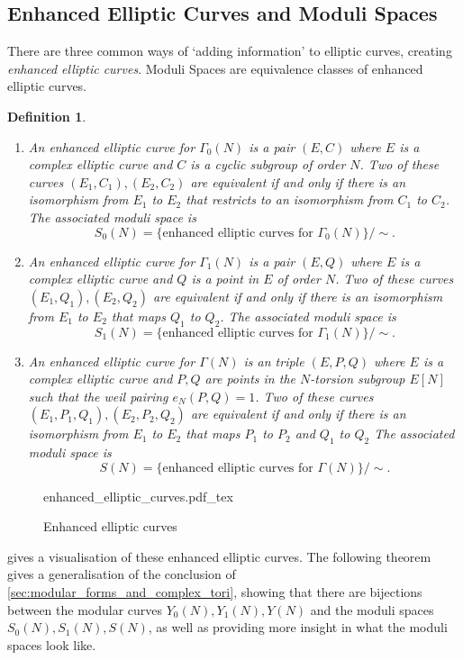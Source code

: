 \documentclass[titlepage,a4paper]{article}
\newcommand{\incfig}[1]{%
	\def\svgwidth{\columnwidth}
	{#1.pdf_tex}
}
\theoremstyle{theoremdd}
\theoremstyle{definitiondd}
\newtheorem{definition}[theorem]{Definition}
\theoremstyle{remarkdd}
\begin{document}
\subsection{Enhanced Elliptic Curves and Moduli Spaces} \label{sec:enhanced_elliptic_curves_and_moduli_spaces}
There are three common ways of `adding information' to elliptic curves, creating \emph{enhanced elliptic curves}. Moduli Spaces are equivalence classes of enhanced elliptic curves.  
\begin{definition} \hspace{\linewidth}
	\begin{enumerate}
		\item An \emph{enhanced elliptic curve for $\Gamma_0(N)$} is a pair $(E, C)$ where  $E$ is a complex elliptic curve and $C$ is a cyclic subgroup of order $N$.
		Two of these curves $(E_1, C_1), (E_2, C_2)$ are equivalent if and only if there is an isomorphism from $E_1$ to $E_2$ that restricts to an isomorphism from $C_1$ to $C_2$.
		The associated \emph{moduli space} is \[
			S_0(N) = \{ \text{enhanced elliptic curves for } \Gamma_0(N)\} / \sim
		.\] 
	\item An \emph{enhanced elliptic curve for $\Gamma_1(N)$} is a pair $(E, Q)$ where  $E$ is a complex elliptic curve and $Q$ is a point in $E$ of order $N$.
		Two of these curves $(E_1, Q_1), (E_2, Q_2)$ are equivalent if and only if there is an isomorphism from $E_1$ to $E_2$ that maps $Q_1$ to $Q_2$.
		The associated \emph{moduli space} is \[
			S_1(N) = \{ \text{enhanced elliptic curves for } \Gamma_1(N)\} / \sim
		.\] 
	\item An \emph{enhanced elliptic curve for $\Gamma(N)$} is an triple $(E, P, Q)$ where  $E$ is a complex elliptic curve and $P, Q$ are points in the $N$-torsion subgroup $E[N]$ such  that the weil pairing  $e_N(P, Q) = 1$.
		Two of these curves $(E_1, P_1, Q_1), (E_2, P_2, Q_2)$ are equivalent if and only if there is an isomorphism from $E_1$ to $E_2$ that maps $P_1$ to $P_2$ and $Q_1$ to $Q_2$
		The associated \emph{moduli space} is \[
			S(N) = \{ \text{enhanced elliptic curves for } \Gamma(N)\} / \sim
		.\] 
	\end{enumerate}	
\end{definition}
\begin{figure}[h]
	\centering
	\incfig{enhanced_elliptic_curves}
	\caption{Enhanced elliptic curves}
	\label{fig:enhanced_elliptic_curves}
\end{figure}
 gives a visualisation of these enhanced elliptic curves.
The following theorem gives a generalisation of the conclusion of \cref{sec:modular_forms_and_complex_tori}, showing that there are bijections between the modular curves $Y_0(N), Y_1(N), Y(N)$ and the moduli spaces $S_0(N), S_1(N), S(N)$, as well as providing more insight in what the moduli spaces look like. 
\end{document}
